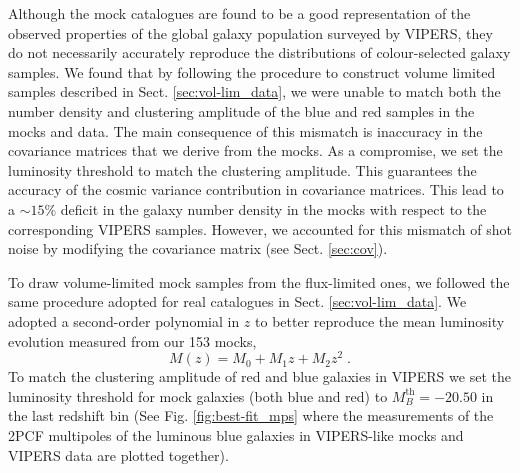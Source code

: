 \documentclass[longauth]{aa}
\def\({\left(}
\def\){\right)}
\begin{document}
Although the mock catalogues are found to be a good representation of the observed properties of the global galaxy population surveyed by VIPERS, they do not necessarily accurately reproduce the distributions of colour-selected galaxy samples.  We found that by following the procedure to construct volume limited samples described in Sect. \ref{sec:vol-lim_data}, we were unable to match both the number density and clustering amplitude of the blue and red samples in the mocks and data.  The main consequence of this mismatch is inaccuracy in the covariance matrices that we derive from the mocks.  As a compromise, we set the luminosity threshold to match the clustering amplitude.  This guarantees the accuracy of the cosmic variance contribution in covariance matrices.  This lead to a $\sim15\%$ deficit in the galaxy number density in the mocks with respect to the corresponding VIPERS samples.
However, we accounted for this mismatch of shot noise by modifying the covariance matrix (see Sect. \ref{sec:cov}).

To draw volume-limited mock samples from the flux-limited ones, we followed the same procedure adopted for real catalogues in Sect. \ref{sec:vol-lim_data}. We adopted a second-order polynomial in $z$ to better reproduce the mean luminosity evolution measured from our 153 mocks,
	\begin{equation}
		M\(z\) = M_0 + M_1z + M_2z^2\; .							\label{eq:lum-evol_mocks}
	\end{equation}
To match the clustering amplitude of red and blue galaxies in VIPERS we set the luminosity threshold for mock galaxies (both blue and red) to $M_B^{\mathrm{th}}=-20.50$ in the last redshift bin (See Fig. \ref{fig:best-fit_mps} where the measurements of the 2PCF multipoles of the luminous blue galaxies in VIPERS-like mocks and VIPERS data are plotted together).

\end{document}
